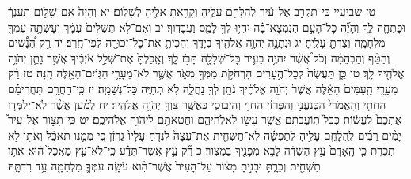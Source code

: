 \documentclass[twoside, openany, parskip=half, 11pt]{book}
\begin{document}
טז שביעיי כִּֽי־תִקְרַ֣ב אֶל־עִ֔יר לְהִלָּחֵ֖ם עָלֶ֑יהָ וְקָרָ֥אתָ אֵלֶ֖יהָ לְשָׁלֽוֹם׃ יא וְהָיָה֙ אִם־שָׁל֣וֹם תַּֽעַנְךָ֔ וּפָתְחָ֖ה לָ֑ךְ וְהָיָ֞ה כׇּל־הָעָ֣ם הַנִּמְצָא־בָ֗הּ יִהְי֥וּ לְךָ֛ לָמַ֖ס וַעֲבָדֽוּךָ׃ יב וְאִם־לֹ֤א תַשְׁלִים֙ עִמָּ֔ךְ וְעָשְׂתָ֥ה עִמְּךָ֖ מִלְחָמָ֑ה וְצַרְתָּ֖ עָלֶֽיהָ׃ יג וּנְתָנָ֛הּ יְהֹוָ֥ה אֱלֹהֶ֖יךָ בְּיָדֶ֑ךָ וְהִכִּיתָ֥ אֶת־כׇּל־זְכוּרָ֖הּ לְפִי־חָֽרֶב׃ יד רַ֣ק הַ֠נָּשִׁ֠ים וְהַטַּ֨ף וְהַבְּהֵמָ֜ה וְכֹל֩ אֲשֶׁ֨ר יִהְיֶ֥ה בָעִ֛יר כׇּל־שְׁלָלָ֖הּ תָּבֹ֣ז לָ֑ךְ וְאָֽכַלְתָּ֙ אֶת־שְׁלַ֣ל אֹיְבֶ֔יךָ אֲשֶׁ֥ר נָתַ֛ן יְהֹוָ֥ה אֱלֹהֶ֖יךָ לָֽךְ׃ טו כֵּ֤ן תַּעֲשֶׂה֙ לְכׇל־הֶ֣עָרִ֔ים הָרְחֹקֹ֥ת מִמְּךָ֖ מְאֹ֑ד אֲשֶׁ֛ר לֹא־מֵעָרֵ֥י הַגּֽוֹיִם־הָאֵ֖לֶּה הֵֽנָּה׃ טז רַ֗ק מֵעָרֵ֤י הָֽעַמִּים֙ הָאֵ֔לֶּה אֲשֶׁר֙ יְהֹוָ֣ה אֱלֹהֶ֔יךָ נֹתֵ֥ן לְךָ֖ נַחֲלָ֑ה לֹ֥א תְחַיֶּ֖ה כׇּל־נְשָׁמָֽה׃ יז כִּֽי־הַחֲרֵ֣ם תַּחֲרִימֵ֗ם הַחִתִּ֤י וְהָאֱמֹרִי֙ הַכְּנַעֲנִ֣י וְהַפְּרִזִּ֔י הַחִוִּ֖י וְהַיְבוּסִ֑י כַּאֲשֶׁ֥ר צִוְּךָ֖ יְהֹוָ֥ה אֱלֹהֶֽיךָ׃ יח לְמַ֗עַן אֲשֶׁ֨ר לֹֽא־יְלַמְּד֤וּ אֶתְכֶם֙ לַעֲשׂ֔וֹת כְּכֹל֙ תּֽוֹעֲבֹתָ֔ם אֲשֶׁ֥ר עָשׂ֖וּ לֵאלֹֽהֵיהֶ֑ם וַחֲטָאתֶ֖ם לַיהֹוָ֥ה אֱלֹהֵיכֶֽם׃
יט כִּֽי־תָצ֣וּר אֶל־עִיר֩ יָמִ֨ים רַבִּ֜ים לְֽהִלָּחֵ֧ם עָלֶ֣יהָ לְתׇפְשָׂ֗הּ לֹֽא־תַשְׁחִ֤ית אֶת־עֵצָהּ֙ לִנְדֹּ֤חַ עָלָיו֙ גַּרְזֶ֔ן כִּ֚י מִמֶּ֣נּוּ תֹאכֵ֔ל וְאֹת֖וֹ לֹ֣א תִכְרֹ֑ת כִּ֤י הָֽאָדָם֙ עֵ֣ץ הַשָּׂדֶ֔ה לָבֹ֥א מִפָּנֶ֖יךָ בַּמָּצֽוֹר׃ כ רַ֞ק עֵ֣ץ אֲשֶׁר־תֵּדַ֗ע כִּֽי־לֹא־עֵ֤ץ מַאֲכָל֙ ה֔וּא אֹת֥וֹ תַשְׁחִ֖ית וְכָרָ֑תָּ וּבָנִ֣יתָ מָצ֗וֹר עַל־הָעִיר֙ אֲשֶׁר־הִ֨וא עֹשָׂ֧ה עִמְּךָ֛ מִלְחָמָ֖ה עַ֥ד רִדְתָּֽהּ׃
\end{document}
